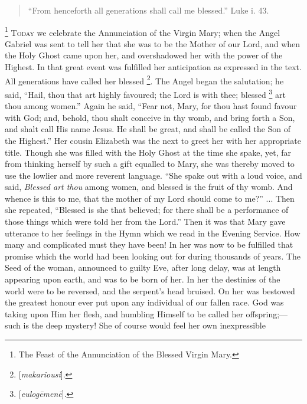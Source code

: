 
\begin{quote}

``From henceforth all generations shall call me blessed.''
Luke i. 43.

\end{quote}

\footnote{The Feast of the Annunciation of the Blessed Virgin Mary.} T\textsc{oday} we celebrate the
Annunciation of the Virgin Mary; when the Angel Gabriel was sent to tell
her that she was to be the Mother of our Lord, and when the Holy Ghost
came upon her, and overshadowed her with the power of the Highest. In
that great event was fulfilled her anticipation as expressed in the
text. All generations have called her blessed \footnote{[\emph{makariousi}].}. The Angel began the salutation; he said, ``Hail, thou that
art highly favoured; the Lord is with thee; blessed \footnote{[\emph{eulog\={e}men\={e}}].} art thou among women.'' Again he said, ``Fear not, Mary,
for thou hast found favour with God; and, behold, thou shalt conceive in
thy womb, and bring forth a Son, and shalt call His name Jesus. He shall
be great, and shall be called the Son of the Highest.'' Her cousin
Elizabeth was the next to greet her with her appropriate title. Though
she was filled with the Holy Ghost at the time she spake, yet, far from
thinking herself by such a gift equalled to Mary, she was thereby moved
to use the lowlier and more reverent language. ``She spake out with
a loud voice, and said, \emph{Blessed art thou} among women, and blessed
is the fruit of thy womb. And whence is this to me, that the mother of
my Lord should come to me?'' ... Then she repeated, ``Blessed is
she that believed; for there shall be a performance of those things
which were told her from the Lord.'' Then it was that Mary gave
utterance to her feelings in the Hymn which we read in the Evening
Service. How many and complicated must they have been! In her was now to
be fulfilled that promise which the world had been looking out for
during thousands of years. The Seed of the woman, announced to guilty
Eve, after long delay, was at length appearing upon earth, and was to be
born of her. In her the destinies of the world were to be reversed, and
the serpent's head bruised. On her was bestowed the greatest honour ever
put upon any individual of our fallen race. God was taking upon Him her
flesh, and humbling Himself to be called her offspring;—such is the
deep mystery! She of course would feel her own inexpressible
